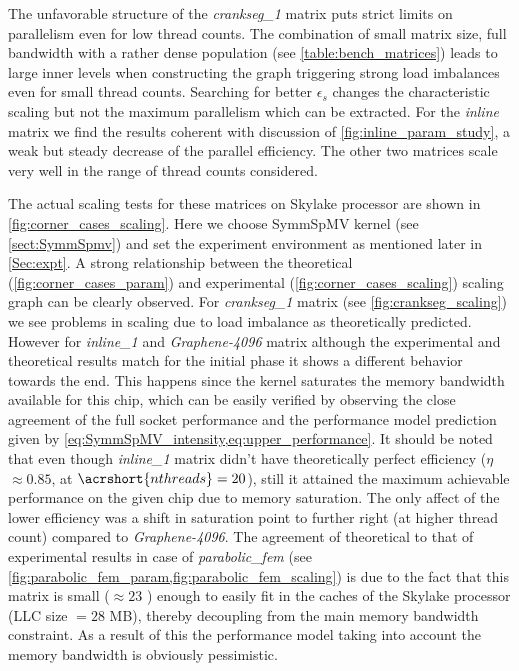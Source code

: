 The unfavorable structure of the \emph{crankseg\_1} matrix puts strict limits on parallelism even for low thread counts.  The combination of small matrix size, full bandwidth with a rather dense population (see \cref{table:bench_matrices}) leads to large inner levels when constructing the graph triggering strong load imbalances even for small thread counts. Searching for better $\epsilon_s$ changes the characteristic scaling but not the maximum parallelism which can be extracted. For the \emph{inline} matrix we find the results coherent with discussion of \cref{fig:inline_param_study}, a weak but steady decrease of the parallel efficiency. The other two matrices scale very well in the range of thread counts considered. 

The actual scaling tests for these matrices on Skylake processor are shown in \cref{fig:corner_cases_scaling}. Here we choose \acrshort{SymmSpMV} kernel (see \cref{sect:SymmSpmv}) and set the experiment environment as mentioned later in \cref{Sec:expt}. A strong relationship between the theoretical  (\cref{fig:corner_cases_param}) and  experimental (\cref{fig:corner_cases_scaling}) scaling graph can be clearly observed. For \emph{crankseg\_1} matrix (see \cref{fig:crankseg_scaling}) we see problems in scaling due to load imbalance as theoretically predicted. However for \emph{inline\_1} and \emph{Graphene-4096} matrix although the experimental and theoretical results match for the initial phase it shows a different behavior towards the end. This happens since the kernel saturates the memory bandwidth available for this chip, which can be easily verified by observing the close agreement of the full socket performance and the performance model prediction given by \cref{eq:SymmSpMV_intensity,eq:upper_performance}. It should be noted that even though \emph{inline\_1} matrix didn't have theoretically perfect efficiency ($\eta$ $\approx 0.85$, at $\acrshort{nthreads}=20$), still it attained the maximum achievable performance on the given chip due to memory saturation. The only affect of the lower efficiency was a shift in saturation point to further right (at higher thread count) compared to \emph{Graphene-4096}. The agreement of theoretical to that of experimental results in case of  \emph{parabolic\_fem}  (see \cref{fig:parabolic_fem_param,fig:parabolic_fem_scaling}) is due to the fact that this matrix is small ($\approx 23$ \MB) enough to easily fit in the caches of the Skylake processor (\acrshort{LLC} size $= 28$ MB), thereby decoupling from the main memory bandwidth constraint. As a result of this the performance model taking into account the memory bandwidth is obviously pessimistic.



